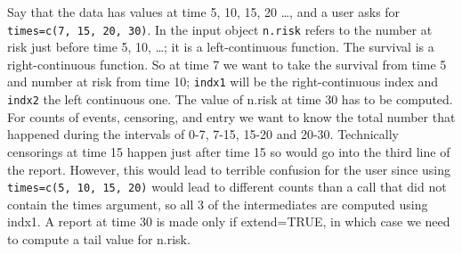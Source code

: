 \documentclass{article}
\newcommand{\code}[1]{\texttt{#1}}
\begin{document}
Say that the data has values at time 5, 10, 15, 20 \ldots, and a user asks
for \code{times=c(7, 15, 20, 30)}.  
In the input object \code{n.risk} refers to the number at risk just before
time 5, 10, \ldots; it is a left-continuous function.  
The survival is a right-continuous function.  So at time 7 we want to 
take the survival from time 5 and number at risk from time 10;
\code{indx1} will be the right-continuous index and \code{indx2} the
left continuous one. The value of n.risk at time 30 has to be computed.
For counts of events, censoring, and entry we want to know the total
number that happened during the intervals of 0-7, 7-15, 15-20 and 20-30.
Technically censorings at time 15 happen just after time 15 so would
go into the third line of the report.
However, this would lead to terrible confusion for the user since
using \code{times=c(5, 10, 15, 20)} would lead to different counts than
a call that did not contain the times argument, so all 3 of the intermediates
are computed using indx1.
A report at time 30 is made only if extend=TRUE, in which case we need
to compute a tail value for n.risk.
\end{document}
